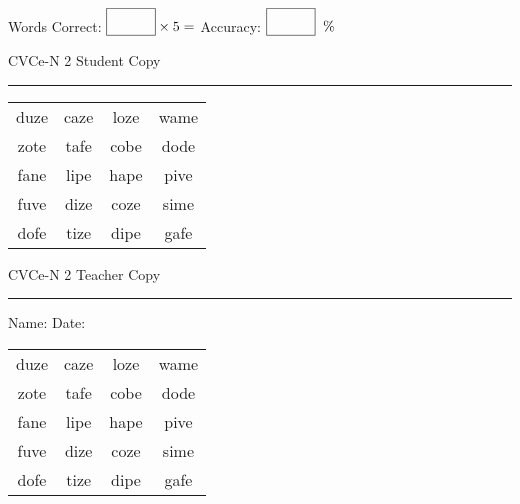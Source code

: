 \documentclass{memoir}
\begin{document}
\small

Words Correct: $\fbox{\phantom{\huge 100}} \times 5 = $ Accuracy: $\fbox{\phantom{\huge 100}}\;\; \%$ 

\vfill

\newpage


\footnotesize \noindent
CVCe-N 2 \hfill Student Copy
\smallskip
\hrule

\Large

\setlength{\tabcolsep}{14pt}
\def\arraystretch{2}

{\selectfont


\begin{vplace}[0.5]
\begin{center}
\begin{tabular}{cccc}
duze & caze & loze & wame \\
zote & tafe & cobe & dode \\
fane & lipe & hape & pive \\
fuve & dize & coze & sime \\
dofe & tize & dipe & gafe \\
\end{tabular}
\end{center}
\end{vplace}

}

\newpage

\footnotesize \noindent
CVCe-N 2 \hfill Teacher Copy
\smallskip
\hrule

\small

\vfill

\noindent
Name: \underline{\hspace{1.75in}} \hfill Date: \underline{\hspace{1in}}

\Large

{\selectfont


\begin{vplace}[0.5]
\begin{center}
\begin{tabular}{cccc}
duze & caze & loze & wame \\
zote & tafe & cobe & dode \\
fane & lipe & hape & pive \\
fuve & dize & coze & sime \\
dofe & tize & dipe & gafe \\
\end{tabular}
\end{center}
\end{vplace}



}
\end{document}
